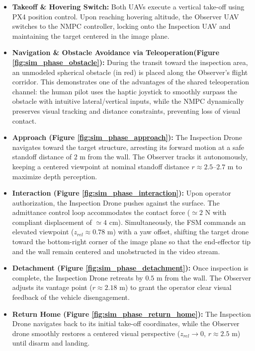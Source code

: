 \begin{itemize}
    \item \textbf{Takeoff \& Hovering Switch:} Both UAVs execute a vertical take-off using PX4 position control. Upon reaching hovering altitude, the Observer UAV switches to the NMPC controller, locking onto the Inspection UAV and maintaining the target centered in the image plane.
    \item \textbf{Navigation \& Obstacle Avoidance via Teleoperation(Figure \ref{fig:sim_phase_obstacle}):} During the transit toward the inspection area, an unmodeled spherical obstacle (in red) is placed along the Observer's flight corridor. This demonstrates one of the advantages of the shared teleoperation channel: the human pilot uses the haptic joystick to smoothly surpass the obstacle with intuitive lateral/vertical inputs, while the NMPC dynamically preserves visual tracking and distance constraints, preventing loss of visual contact.
    \item \textbf{Approach (Figure \ref{fig:sim_phase_approach}):} The Inspection Drone navigates toward the target structure, arresting its forward motion at a safe standoff distance of $2\text{ m}$ from the wall. The Observer tracks it autonomously, keeping a centered viewpoint at nominal standoff distance $r \approx 2.5\text{--}2.7\text{ m}$ to maximize depth perception.
    \item \textbf{Interaction (Figure \ref{fig:sim_phase_interaction}):} Upon operator authorization, the Inspection Drone pushes against the surface. The admittance control loop accommodates the contact force ($\simeq 2\text{ N}$ with compliant displacement of $\simeq 4\text{ cm}$). Simultaneously, the FSM commands an elevated viewpoint ($z_{rel} \approx 0.78\text{ m}$) with a yaw offset, shifting the target drone toward the bottom-right corner of the image plane so that the end-effector tip and the wall remain centered and unobstructed in the video stream.
    \item \textbf{Detachment (Figure \ref{fig:sim_phase_detachment}):} Once inspection is complete, the Inspection Drone retreats by $0.5\text{ m}$ from the wall. The Observer adjusts its vantage point ($r \approx 2.18\text{ m}$) to grant the operator clear visual feedback of the vehicle disengagement.
    \item \textbf{Return Home (Figure \ref{fig:sim_phase_return_home}):} The Inspection Drone navigates back to its initial take-off coordinates, while the Observer drone smoothly restores a centered visual perspective ($z_{rel} \to 0$, $r \approx 2.5\text{ m}$) until disarm and landing.
\end{itemize}
